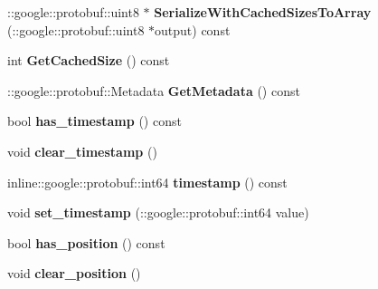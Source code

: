 \begin{DoxyCompactItemize}
\item 
\hypertarget{classedcdatatypes_1_1_edc_payload_a323ceda18d9580eccca9286f93d51792}{\-::google\-::protobuf\-::uint8 $\ast$ {\bfseries Serialize\-With\-Cached\-Sizes\-To\-Array} (\-::google\-::protobuf\-::uint8 $\ast$output) const }\label{classedcdatatypes_1_1_edc_payload_a323ceda18d9580eccca9286f93d51792}

\item 
\hypertarget{classedcdatatypes_1_1_edc_payload_a0369652d38b76f6cb5e735031cacc0fd}{int {\bfseries Get\-Cached\-Size} () const }\label{classedcdatatypes_1_1_edc_payload_a0369652d38b76f6cb5e735031cacc0fd}

\item 
\hypertarget{classedcdatatypes_1_1_edc_payload_a66ca656e6c37b7425777f73bb9838d0f}{\-::google\-::protobuf\-::\-Metadata {\bfseries Get\-Metadata} () const }\label{classedcdatatypes_1_1_edc_payload_a66ca656e6c37b7425777f73bb9838d0f}

\item 
\hypertarget{classedcdatatypes_1_1_edc_payload_ad90c0f27581bec3596c18bbc9fb551bb}{bool {\bfseries has\-\_\-timestamp} () const }\label{classedcdatatypes_1_1_edc_payload_ad90c0f27581bec3596c18bbc9fb551bb}

\item 
\hypertarget{classedcdatatypes_1_1_edc_payload_a37b18f597b396b8925369c6065a1c778}{void {\bfseries clear\-\_\-timestamp} ()}\label{classedcdatatypes_1_1_edc_payload_a37b18f597b396b8925369c6065a1c778}

\item 
\hypertarget{classedcdatatypes_1_1_edc_payload_a3ac6b7e09696c8f804dbbfe486e9836d}{inline\-::google\-::protobuf\-::int64 {\bfseries timestamp} () const }\label{classedcdatatypes_1_1_edc_payload_a3ac6b7e09696c8f804dbbfe486e9836d}

\item 
\hypertarget{classedcdatatypes_1_1_edc_payload_adbc6652b8c42b28066a7672f19ba6caa}{void {\bfseries set\-\_\-timestamp} (\-::google\-::protobuf\-::int64 value)}\label{classedcdatatypes_1_1_edc_payload_adbc6652b8c42b28066a7672f19ba6caa}

\item 
\hypertarget{classedcdatatypes_1_1_edc_payload_a29cea2c8ed56f41dce43da64a8146eda}{bool {\bfseries has\-\_\-position} () const }\label{classedcdatatypes_1_1_edc_payload_a29cea2c8ed56f41dce43da64a8146eda}

\item 
\hypertarget{classedcdatatypes_1_1_edc_payload_a56e50ab8beeb322d2d14caa3bacf727d}{void {\bfseries clear\-\_\-position} ()}\label{classedcdatatypes_1_1_edc_payload_a56e50ab8beeb322d2d14caa3bacf727d}


\end{DoxyCompactItemize}
